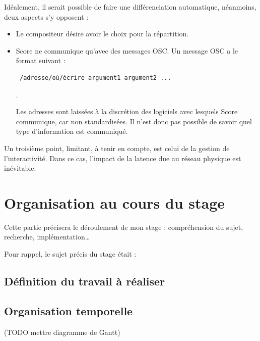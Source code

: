 Idéalement, il serait possible de faire une différenciation automatique, néanmoins, deux aspects s'y opposent : 
\begin{itemize}
\item Le compositeur désire avoir le choix pour la répartition.
\item Score ne communique qu'avec des messages \ac{OSC}. Un message \ac{OSC} a le format suivant : 
\begin{verbatim} /adresse/où/écrire argument1 argument2 ... \end{verbatim}.

Les adresses sont laissées à la discrétion des logiciels avec lesquels Score communique, car non standardisées. Il n'est donc pas possible de savoir quel type d'information est communiqué. 
\end{itemize}
Un troisième point, limitant, à tenir en compte, est celui de la gestion de l'interactivité. Dans ce cas, l'impact de la latence due au réseau physique est inévitable.

\section{Organisation au cours du stage}
Cette partie précisera le déroulement de mon stage : compréhension du sujet, recherche, implémentation\dots

Pour rappel, le sujet précis du stage était : 
\begin{center}
	\noindent{}
\end{center}


\subsection{Définition du travail à réaliser}
\subsection{Organisation temporelle}
(TODO mettre diagramme de Gantt)